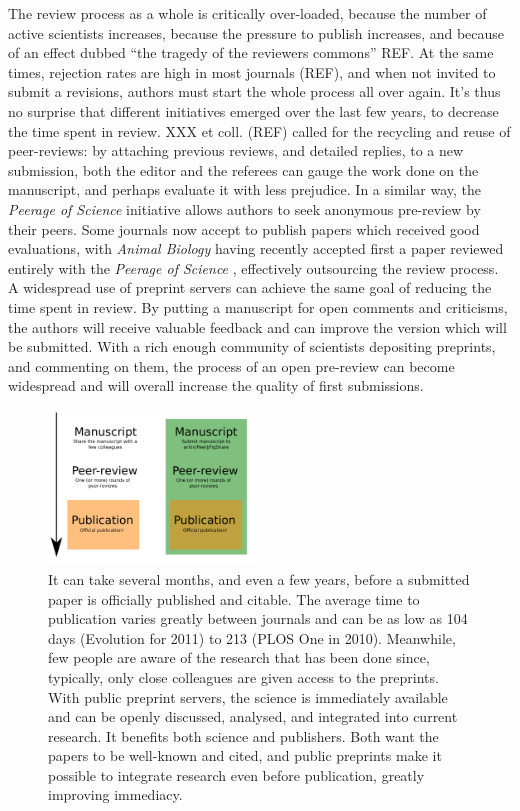 \documentclass[letterpaper,twocolumn,superscriptaddress,showkeys]{revtex4}
\begin{document}
The review process as a whole is critically over-loaded, because the number of
active scientists increases, because the pressure to publish increases, and
because of an effect dubbed ``the tragedy of the reviewers commons'' REF.  At
the same times, rejection rates are high in most journals (REF), and when not
invited to submit a revisions, authors must start the whole process all over
again. It's thus no surprise that different initiatives emerged over the last
few years, to decrease the time spent in review. XXX et coll. (REF) called for
the recycling and reuse of peer-reviews: by attaching previous reviews, and
detailed replies, to a new submission, both the editor and the referees can
gauge the work done on the manuscript, and perhaps evaluate it with less
prejudice. In a similar way, the \emph{Peerage of Science} initiative allows
authors to seek anonymous pre-review by their peers. Some journals now accept to
publish papers which received good evaluations, with \emph{Animal Biology}
having recently accepted first a paper reviewed entirely with the \emph{Peerage of
Science} \cite{abb12}, effectively outsourcing the review process. A widespread
use of preprint servers can achieve the same goal of reducing the time spent in
review. By putting a manuscript for open comments and criticisms, the authors
will receive valuable feedback and can improve the version which will be
submitted. With a rich enough community of scientists depositing preprints, and
commenting on them, the process of an open pre-review can become widespread and
will overall increase the quality of first submissions.

\begin{figure}[ht!] \centering\includegraphics[width=0.50\textwidth]{map.pdf}
\caption { It can take several months, and even a few years, before a submitted
paper is officially published and citable.  The average time to publication
varies greatly between journals and can be as low as 104 days (Evolution for
2011) to 213 (PLOS One in 2010).  Meanwhile, few people are aware of the
research that has been done since, typically, only close colleagues are given
access to the preprints. With public preprint servers, the science is
immediately available and can be openly discussed, analysed, and integrated into
current research. It benefits both science and publishers. Both want the papers
to be well-known and cited, and public preprints make it possible to integrate
research even before publication, greatly improving immediacy.  }
\label{fig:map} \end{figure}
\end{document}
